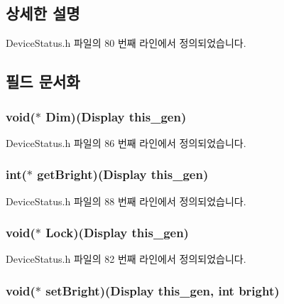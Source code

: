 \subsection{상세한 설명}


Device\-Status.\-h 파일의 80 번째 라인에서 정의되었습니다.



\subsection{필드 문서화}
\hypertarget{struct___display_afe07206478960f03a500e7fc2b710446}{
\subsubsection[{Dim}]{\setlength{\rightskip}{0pt plus 5cm}void($\ast$  Dim)({\bf Display} this\-\_\-gen)}}\label{struct___display_afe07206478960f03a500e7fc2b710446}


Device\-Status.\-h 파일의 86 번째 라인에서 정의되었습니다.

\hypertarget{struct___display_a61cbbbd330281072786ca6289de92a3a}{
\subsubsection[{get\-Bright}]{\setlength{\rightskip}{0pt plus 5cm}int($\ast$  get\-Bright)({\bf Display} this\-\_\-gen)}}\label{struct___display_a61cbbbd330281072786ca6289de92a3a}


Device\-Status.\-h 파일의 88 번째 라인에서 정의되었습니다.

\hypertarget{struct___display_a8ebb33d01cded0db9f4bcdbcf44e90d0}{
\subsubsection[{Lock}]{\setlength{\rightskip}{0pt plus 5cm}void($\ast$  Lock)({\bf Display} this\-\_\-gen)}}\label{struct___display_a8ebb33d01cded0db9f4bcdbcf44e90d0}


Device\-Status.\-h 파일의 82 번째 라인에서 정의되었습니다.

\hypertarget{struct___display_acb57f785b1df759aa711224a445c004f}{
\subsubsection[{set\-Bright}]{\setlength{\rightskip}{0pt plus 5cm}void($\ast$  set\-Bright)({\bf Display} this\-\_\-gen, int bright)}}\label{struct___display_acb57f785b1df759aa711224a445c004f}


